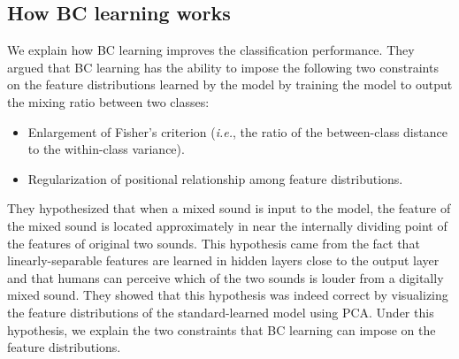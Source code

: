 \documentclass[10pt,twocolumn,letterpaper]{article}
\begin{document}
\subsection{How BC learning works}
We explain how BC learning improves the classification performance. They argued that BC learning has the ability to impose the following two constraints on the feature distributions learned by the model by training the model to output the mixing ratio between two classes:
\begin{itemize}
\vspace{-1mm}
\setlength{\itemsep}{0cm} 
 \item{Enlargement of Fisher's criterion \cite{fisher1936use} ({\it i.e.}, the ratio of the between-class distance to the within-class variance).} 
 \item{Regularization of positional relationship among feature distributions.} 
\end{itemize}

They hypothesized that when a mixed sound is input to the model, the feature of the mixed sound is located approximately in near the internally dividing point of the features of original two sounds. This hypothesis came from the fact that linearly-separable features are learned in hidden layers close to the output layer \cite{an2015can} and that humans can perceive which of the two sounds is louder from a digitally mixed sound. They showed that this hypothesis was indeed correct by visualizing the feature distributions of the standard-learned model using PCA. Under this hypothesis, we explain the two constraints that BC learning can impose on the feature distributions.


\end{document}
